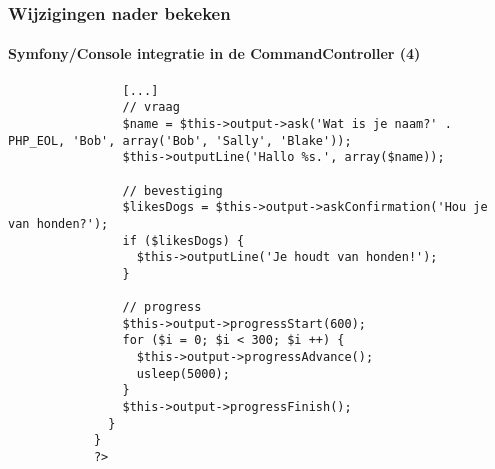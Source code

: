 
\begin{frame}[fragile]
	\frametitle{Wijzigingen nader bekeken}
	\framesubtitle{Symfony/Console integratie in de CommandController (4)}

	\lstset{basicstyle=\tiny\ttfamily}

		\begin{lstlisting}
			    [...]
			    // vraag
			    $name = $this->output->ask('Wat is je naam?' . PHP_EOL, 'Bob', array('Bob', 'Sally', 'Blake'));
			    $this->outputLine('Hallo %s.', array($name));

			    // bevestiging
			    $likesDogs = $this->output->askConfirmation('Hou je van honden?');
			    if ($likesDogs) {
			      $this->outputLine('Je houdt van honden!');
			    }

			    // progress
			    $this->output->progressStart(600);
			    for ($i = 0; $i < 300; $i ++) {
			      $this->output->progressAdvance();
			      usleep(5000);
			    }
			    $this->output->progressFinish();
			  }
			}
			?>
		\end{lstlisting}

\end{frame}


